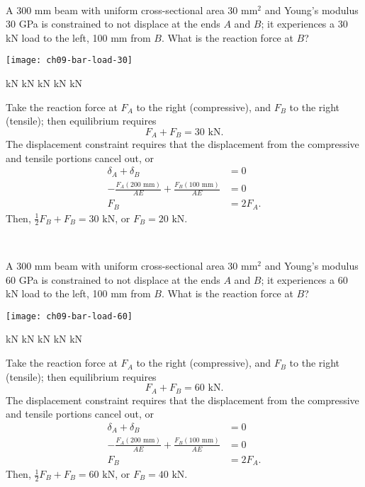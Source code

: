 \variant
\\
\begin{minipage}[t]{3in}
A 300 mm beam with uniform cross-sectional area 30 mm$^2$ and Young's modulus 30 GPa is constrained to not displace at the ends $A$ and $B$; it experiences a 30 kN load to the left, 100 mm from $B$. What is the reaction force at $B$?
\end{minipage}
\quad
\begin{minipage}[t]{3in}
\vspace{-24pt}
\texttt{[image: ch09-bar-load-30]}
\end{minipage}
\vspace{-12pt}
\begin{answers}
 kN
 kN
 kN
 kN
 kN
\end{answers}
\begin{solution}
Take the reaction force at $F_A$ to the right (compressive), and $F_B$ to the right (tensile); then equilibrium requires
\[
F_A + F_B = 30\text{ kN}.
\]
The displacement constraint requires that the displacement from the compressive and tensile portions cancel out, or
\[
\begin{split}
\delta_{A} + \delta_B &= 0\\
-\frac{F_A(200\text{ mm})}{AE} + \frac{F_B(100\text{ mm})}{AE} &= 0\\
F_B &= 2F_A.
\end{split}
\]
Then, $\frac12 F_B + F_B = 30\text{ kN}$, or $F_B = 20\text{ kN}$.
\end{solution}

\variant
\\
\begin{minipage}[t]{3in}
A 300 mm beam with uniform cross-sectional area 30 mm$^2$ and Young's modulus 60 GPa is constrained to not displace at the ends $A$ and $B$; it experiences a 60 kN load to the left, 100 mm from $B$. What is the reaction force at $B$?
\end{minipage}
\quad
\begin{minipage}[t]{3in}
\vspace{-24pt}
\texttt{[image: ch09-bar-load-60]}
\end{minipage}
\vspace{-12pt}
\begin{answers}
 kN
 kN
 kN
 kN
 kN
\end{answers}
\begin{solution}
Take the reaction force at $F_A$ to the right (compressive), and $F_B$ to the right (tensile); then equilibrium requires
\[
F_A + F_B = 60\text{ kN}.
\]
The displacement constraint requires that the displacement from the compressive and tensile portions cancel out, or
\[
\begin{split}
\delta_{A} + \delta_B &= 0\\
-\frac{F_A(200\text{ mm})}{AE} + \frac{F_B(100\text{ mm})}{AE} &= 0\\
F_B &= 2F_A.
\end{split}
\]
Then, $\frac12 F_B + F_B = 60\text{ kN}$, or $F_B = 40\text{ kN}$.
\end{solution}

